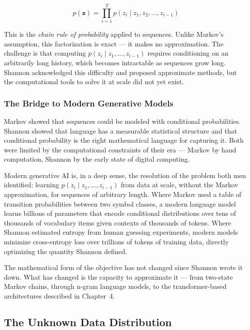 \documentclass{book}
\begin{document}
\begin{equation}
p(\mathbf{z}) = \prod_{i=1}^{T} p(z_i \mid z_1, z_2, \ldots, z_{i-1})
\end{equation}

This is the \emph{chain rule of probability} applied to sequences. Unlike
Markov's assumption, this factorization is exact --- it makes no approximation.
The challenge is that computing $p(z_i \mid z_1, \ldots, z_{i-1})$ requires
conditioning on an arbitrarily long history, which becomes intractable as
sequences grow long. Shannon acknowledged this difficulty and proposed
approximate methods, but the computational tools to solve it at scale did not
yet exist.

\subsubsection*{The Bridge to Modern Generative Models}

Markov showed that sequences could be modeled with conditional probabilities.
Shannon showed that language has a measurable statistical structure and that
conditional probability is the right mathematical language for capturing it.
Both were limited by the computational constraints of their era --- Markov by
hand computation, Shannon by the early state of digital computing.

Modern generative AI is, in a deep sense, the resolution of the problem both
men identified: learning $p(z_i \mid z_1, \ldots, z_{i-1})$ from data at
scale, without the Markov approximation, for sequences of arbitrary length.
Where Markov used a table of transition probabilities between two symbol
classes, a modern language model learns billions of parameters that encode
conditional distributions over tens of thousands of vocabulary items given
contexts of thousands of tokens. Where Shannon estimated entropy from human
guessing experiments, modern models minimize cross-entropy loss over trillions
of tokens of training data, directly optimizing the quantity Shannon defined.

The mathematical form of the objective has not changed since Shannon wrote it
down. What has changed is the capacity to approximate it --- from two-state
Markov chains, through n-gram language models, to the transformer-based
architectures described in Chapter~4.

\subsection{The Unknown Data Distribution}
\end{document}

